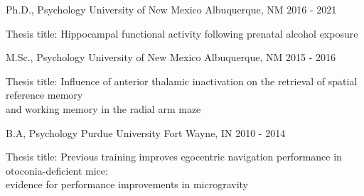 

\begin{cventries}
  \cventry
    {Ph.D., Psychology} %
    {University of New Mexico} %
    {Albuquerque, NM} %
    {2016 - 2021} %
    {
    \begin{cvitems} %
        \item {Thesis title: Hippocampal functional activity following prenatal alcohol exposure}
    \end{cvitems}
    }   
  \cventry
    {M.Sc., Psychology} %
    {University of New Mexico} %
    {Albuquerque, NM} %
    {2015 - 2016} %
    {
    \begin{cvitems} %
        \item {Thesis title: Influence of anterior thalamic inactivation on the retrieval of spatial reference memory \\ and working memory in the radial arm maze}
    \end{cvitems}
    }   
  \cventry
    {B.A, Psychology} %
    {Purdue University} %
    {Fort Wayne, IN} %
    {2010 - 2014} %
    {
    \begin{cvitems} %
        \item {Thesis title: Previous training improves egocentric navigation performance in otoconia-deficient mice: \\ evidence for performance improvements in microgravity}
    \end{cvitems}
    }    
\end{cventries}